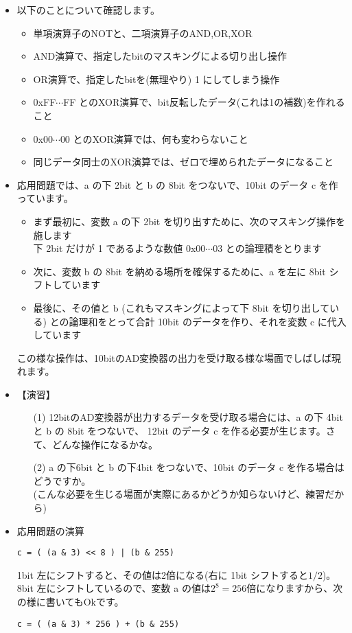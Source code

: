 \documentclass[uplatex, a4paper,11pt]{jsarticle}
\begin{document}
\begin{itemize}
\item 以下のことについて確認します。
\begin{itemize}
  \item 単項演算子のNOTと、二項演算子のAND,OR,XOR
  \item AND演算で、指定したbitのマスキングによる切り出し操作
  \item OR演算で、指定したbitを(無理やり) 1 にしてしまう操作
  \item 0xFF$\cdots$FF とのXOR演算で、bit反転したデータ(これは1の補数)を作れること
  \item 0x00$\cdots$00 とのXOR演算では、何も変わらないこと
  \item 同じデータ同士のXOR演算では、ゼロで埋められたデータになること 
\end{itemize}
\item 応用問題では、a の下 2bit と b の 8bit をつないで、10bit のデータ c を作っています。
\begin{itemize}
\item まず最初に、変数 a の下 2bit を切り出すために、次のマスキング操作を施します\\下 2bit だけが 1 であるような数値 0x00$\cdots$03 との論理積をとります
\item 次に、変数 b の 8bit を納める場所を確保するために、a を左に 8bit シフトしています
\item 最後に、その値と b (これもマスキングによって下 8bit を切り出している) との論理和をとって合計 10bit のデータを作り、それを変数 c に代入しています
\end{itemize}
この様な操作は、10bitのAD変換器の出力を受け取る様な場面でしばしば現れます。\\
\item 【演習】
\begin{itemize}
\item[(1)] 12bitのAD変換器が出力するデータを受け取る場合には、a の下 4bit と b の 8bit をつないで、
12bit のデータ c を作る必要が生じます。さて、どんな操作になるかな。
\item[(2)] a の下6bit と b の下4bit をつないで、10bit のデータ c を作る場合はどうですか。\\
(こんな必要を生じる場面が実際にあるかどうか知らないけど、練習だから) 
\end{itemize}
\item 応用問題の演算
\begin{verbatim}
c = ( (a & 3) << 8 ) | (b & 255)
\end{verbatim}
1bit 左にシフトすると、その値は2倍になる(右に 1bit シフトすると$1/2$)。
8bit 左にシフトしているので、変数 a の値は$2^8=256$倍になりますから、次の様に書いてもOkです。
\begin{verbatim}
c = ( (a & 3) * 256 ) + (b & 255)
\end{verbatim}


\end{itemize}
\end{document}

